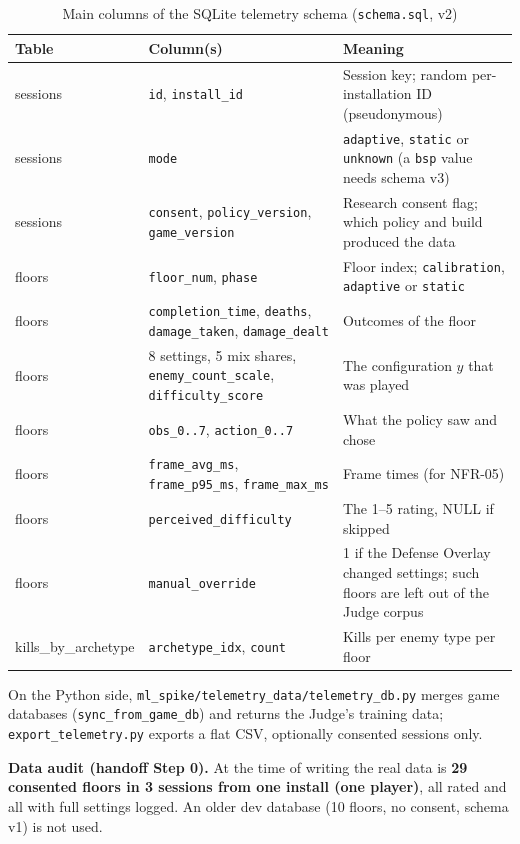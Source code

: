 \begin{table}[!htbp]
\centering
\caption{Main columns of the SQLite telemetry schema (\texttt{schema.sql}, v2)}
\label{tab:sqlite_schema}
\scriptsize
\begin{tabular}{p{}p{}p{}}
\toprule
\textbf{Table} & \textbf{Column(s)} & \textbf{Meaning} \\
\midrule
sessions & \texttt{id}, \texttt{install\_id} & Session key; random per-installation ID (pseudonymous) \\
sessions & \texttt{mode} & \texttt{adaptive}, \texttt{static} or \texttt{unknown} (a \texttt{bsp} value needs schema v3) \\
sessions & \texttt{consent}, \texttt{policy\_version}, \texttt{game\_version} & Research consent flag; which policy and build produced the data \\
floors & \texttt{floor\_num}, \texttt{phase} & Floor index; \texttt{calibration}, \texttt{adaptive} or \texttt{static} \\
floors & \texttt{completion\_time}, \texttt{deaths}, \texttt{damage\_taken}, \texttt{damage\_dealt} & Outcomes of the floor \\
floors & 8 settings, 5 mix shares, \texttt{enemy\_count\_scale}, \texttt{difficulty\_score} & The configuration $y$ that was played \\
floors & \texttt{obs\_0..7}, \texttt{action\_0..7} & What the policy saw and chose \\
floors & \texttt{frame\_avg\_ms}, \texttt{frame\_p95\_ms}, \texttt{frame\_max\_ms} & Frame times (for NFR-05) \\
floors & \texttt{perceived\_difficulty} & The 1--5 rating, NULL if skipped \\
floors & \texttt{manual\_override} & 1 if the Defense Overlay changed settings; such floors are left out of the Judge corpus \\
kills\_by\_archetype & \texttt{archetype\_idx}, \texttt{count} & Kills per enemy type per floor \\
\bottomrule
\end{tabular}
\end{table}

On the Python side, \texttt{ml\_spike/telemetry\_data/telemetry\_db.py} merges game databases (\texttt{sync\_from\_game\_db}) and returns the Judge's training data; \texttt{export\_telemetry.py} exports a flat CSV, optionally consented sessions only.

\textbf{Data audit (handoff Step 0).} At the time of writing the real data is \textbf{29 consented floors in 3 sessions from one install (one player)}, all rated and all with full settings logged. An older dev database (10 floors, no consent, schema v1) is not used. 

